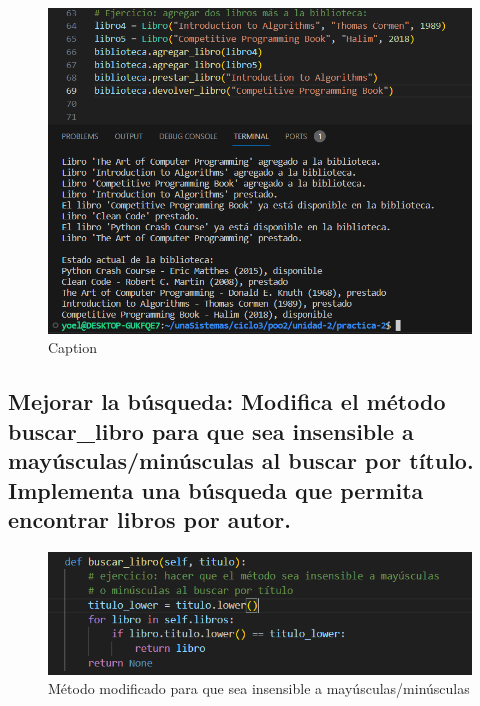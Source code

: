 \documentclass[11pt,a4paper]{article}
\begin{document}
\begin{figure}[H]
    \centering
    \includegraphics{images/2-ejercicio1.png}
    \caption{Caption}
    \label{fig:enter-label}
\end{figure}

\subsection{Mejorar la búsqueda:
Modifica el método buscar\_libro para que sea insensible a mayúsculas/minúsculas al buscar por título.
Implementa una búsqueda que permita encontrar libros por autor.}
\begin{figure}[H]
    \centering
    \includegraphics{images/3-ej2-1.png}
    \caption{Método modificado para que sea insensible a mayúsculas/minúsculas}
    \label{fig:enter-label}
\end{figure}
\end{document}
